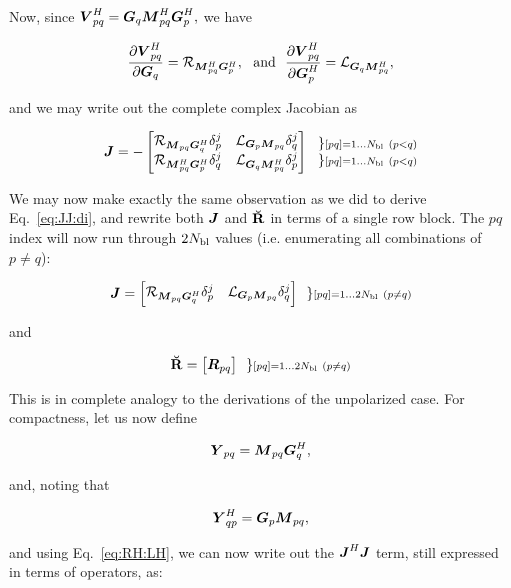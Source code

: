 \documentclass[useAMS,usenatbib]{mn2e}
\newcommand{\mat}[1]{{\bmath{#1}}}
\newcommand{\JJ}{\mat{J}} %
\newcommand{\MM}{\mat{M}}
\newcommand{\VV}{\mat{V}}
\newcommand{\GG}{\mat{G}}
\newcommand{\JHJ}{\JJ^H\JJ} %
\begin{document}
Now, since $\VV^H_{pq}=\GG_q \MM^H_{pq} \GG^H_p,$ we have

\begin{equation}
\label{eq:dRH:dG}
\frac{\partial\VV^H_{pq}}{\partial\GG_q} = \Rop{\MM^H_{pq}\GG^H_p},\mathrm{~~and~~}
\frac{\partial\VV^H_{pq}}{\partial\GG^H_p} = \Lop{\GG_q \MM^H_{pq}},
\end{equation}

and we may write out the complete complex Jacobian as

\[
\JJ = - \Matrix{cc}{ 
\Rop{ \MM_{pq}\GG^H_q }\delta^j_p & 
\Lop{ \GG_p \MM_{pq}  }\delta^j_q \\
\Rop{ \MM^H_{pq} \GG^H_p } \delta^j_q & 
\Lop{ \GG_q \MM^H_{pq}  } \delta^j_p  
}~~ 
\Stack{ 
\} \scriptstyle [pq]=1\dots \Nbl~(p<q) \\ 
\} \scriptstyle [pq]=1\dots \Nbl~(p<q) 
}
\]

We may now make exactly the same observation as we did to derive Eq.~\ref{eq:JJ:di}, and rewrite both $\JJ$ and $\mathbf{\breve{R}}$ in terms of 
a single row block. The $pq$ index will now run through $2N_\mathrm{bl}$ values (i.e. enumerating all combinations of $p\ne q$):

\begin{equation}
\label{eq:JJ:pol}
\JJ = \Matrix{cc}{ 
\Rop{ \MM_{pq}\GG^H_q }\delta^j_p & 
\Lop{ \GG_p \MM_{pq}  }\delta^j_q \\
}~~ 
\} \scriptstyle [pq]=1\dots 2\Nbl~(p\ne q)\\ 
\end{equation}

and 

\begin{equation}
\RRr = \Matrix{c}{ \mat{R}_{pq}}~~ 
\} \scriptstyle [pq]=1\dots 2\Nbl~(p\ne q)\\ 
\end{equation}

This is in complete analogy to the derivations of the unpolarized case. For compactness, let us now define

\newcommand{\YY}{\mat{Y}}
\newcommand{\ZZ}{\mat{Z}}
\[
\YY_{pq} = \MM_{pq} \GG^H_q,
\]

and, noting that 

\[
\YY_{qp}^H = \GG_p \MM_{pq},
\]

and using Eq.~\ref{eq:RH:LH}, we can now write out the $\JHJ$ term, still expressed in terms of 
operators, as:
\end{document}
